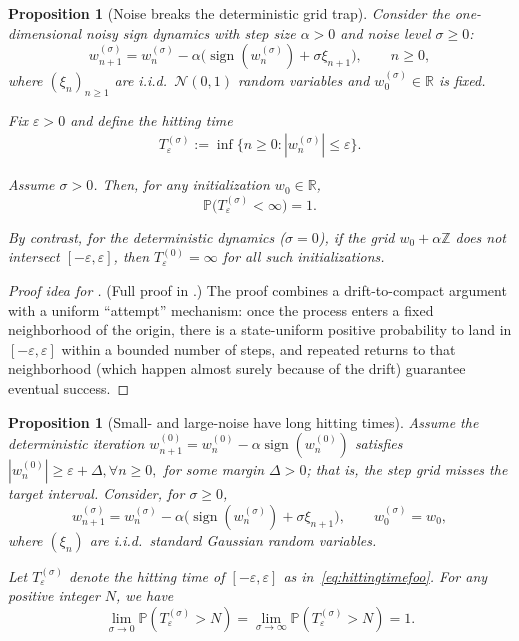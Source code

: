 \documentclass{article}
\theoremstyle{plain}
\newtheorem{proposition}[theorem]{Proposition}
\theoremstyle{definition}
\theoremstyle{remark}
\newcommand{\R}{\mathbb{R}}
\newcommand{\Z}{\mathbb{Z}}
\newcommand{\PP}{\mathbb{P}}
\newcommand{\stepsize}{\alpha}
\newcommand{\sign}{\operatorname{sign}}
\newcommand{\eps}{\varepsilon}
\begin{document}
\begin{proposition}[Noise breaks the deterministic grid trap]
\label{prop:noise-breaks-grid}
Consider the one-dimensional noisy sign dynamics with step size $\stepsize>0$
and noise level $\sigma\ge 0$:
\[
  w_{n+1}^{(\sigma)}
  = w_n^{(\sigma)} - \stepsize\bigl(\sign(w_n^{(\sigma)}) + \sigma \xi_{n+1}\bigr),
  \qquad n \ge 0,
\]
where $(\xi_n)_{n\ge1}$ are i.i.d.\ $\mathcal{N}(0,1)$ random variables and $w_0^{(\sigma)}\in\R$ is fixed. 

Fix $\eps>0$ and define the hitting time
\begin{align}
  T_\eps^{(\sigma)} := \inf\{n \ge 0 : |w_n^{(\sigma)}| \le \eps\}.
  \label{eq:hittingtimefoo}
\end{align}

Assume $\sigma>0$. 
Then, for any initialization $w_0\in\R$,
\[
  \PP\bigl(T_\eps^{(\sigma)} < \infty\bigr) = 1.
\]

By contrast, for the deterministic dynamics ($\sigma = 0$), if the grid
$w_0 + \stepsize\Z$ does not intersect $[-\eps,\eps]$, then
$T_\eps^{(0)} = \infty$ for all such initializations.
\end{proposition}

\begin{proof}[Proof idea for ]
  (Full proof in .)
The proof combines a drift-to-compact argument
with a uniform ``attempt'' mechanism:
once the process enters a fixed neighborhood of the origin, 
there is a state-uniform positive probability to land in $[-\eps,\eps]$ 
within a bounded number of steps, 
and repeated returns to that neighborhood 
(which happen almost surely because of the drift)
guarantee eventual success.
\end{proof}

\begin{proposition}[Small- and large-noise have long hitting times]
\label{prop:small-large-noise-long-hitting}
Assume the deterministic iteration
$
  w_{n+1}^{(0)} = w_n^{(0)} - \stepsize \sign(w_n^{(0)})
$
satisfies
$
  |w_n^{(0)}| \ge \eps + \Delta, \forall n\ge 0,
$
for some margin $\Delta>0$; that is, the step grid misses the target interval.
Consider, for $\sigma\ge 0$,
\[
  w_{n+1}^{(\sigma)}
  = w_n^{(\sigma)} - \stepsize\bigl(\sign(w_n^{(\sigma)}) + \sigma\xi_{n+1}\bigr),
  \qquad w_0^{(\sigma)} = w_0,
\]
where $(\xi_n)$ are i.i.d.\ standard Gaussian random variables. 

Let $T_\eps^{(\sigma)}$ denote the hitting time of $[-\eps,\eps]$ as in~\eqref{eq:hittingtimefoo}. 
For any positive integer $N$, we have
\[
  \lim_{\sigma\to 0}
  \PP\left(T_\eps^{(\sigma)} > N\right)
  =
  \lim_{\sigma\to \infty}
  \PP\left(T_\eps^{(\sigma)} > N\right)
  = 1.
\]
\end{proposition}
\end{document}
